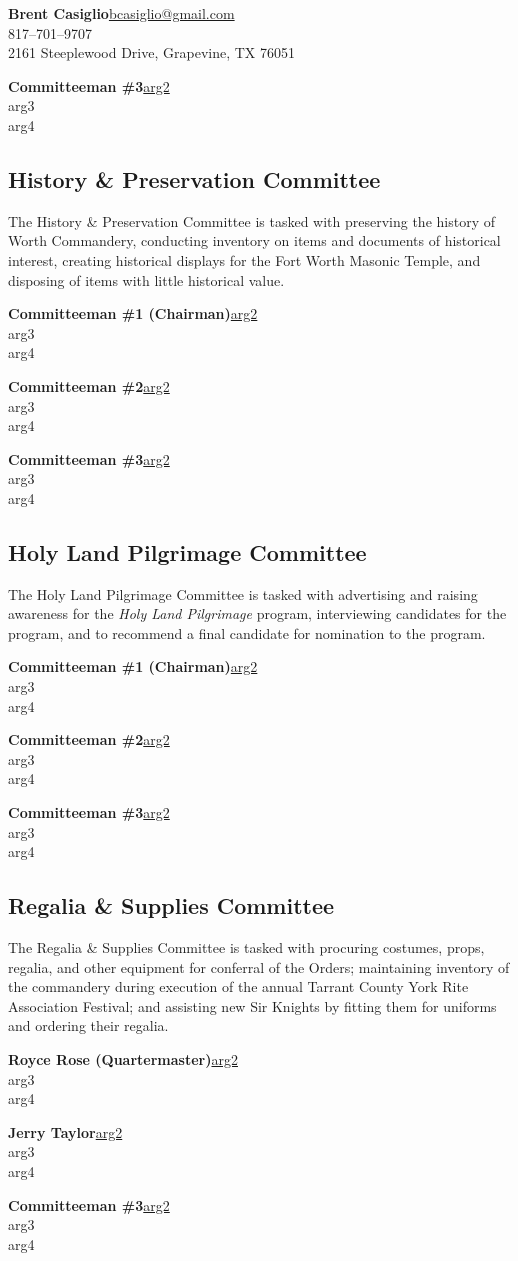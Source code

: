 \documentclass[letterpaper]{article}
\newcommand{\cman}[4]{\textbf{#1}\hfill{}\url{#2}\\\hphantom{0em}\hfill{}#3\\\hphantom{0em}\hfill{}#4}
\newcommand{\comm}[3]{\subsection*{#1 Committee\textsuperscript{#2}}The #1 Committee is tasked with #3}
\begin{document}
		\cman{Brent Casiglio}{bcasiglio@gmail.com}{817--701--9707}{2161 Steeplewood Drive, Grapevine, TX 76051}
		
		\cman{Committeeman \#3}{arg2}{arg3}{arg4}
		
		
		
		

	\comm{History \& Preservation}{}{preserving the history of Worth Commandery, conducting inventory on items and documents of historical interest, creating historical displays for the Fort Worth Masonic Temple, and disposing of items with little historical value.}
	
		\cman{Committeeman \#1 (Chairman)}{arg2}{arg3}{arg4}
		
		\cman{Committeeman \#2}{arg2}{arg3}{arg4}
		
		\cman{Committeeman \#3}{arg2}{arg3}{arg4}
	
	\comm{Holy Land Pilgrimage}{}{advertising and raising awareness for the \textit{Holy Land Pilgrimage} program, interviewing candidates for the program, and to recommend a final candidate for nomination to the program.}
	
		\cman{Committeeman \#1 (Chairman)}{arg2}{arg3}{arg4}
		
		\cman{Committeeman \#2}{arg2}{arg3}{arg4}
		
		\cman{Committeeman \#3}{arg2}{arg3}{arg4}
	
	\comm{Regalia \& Supplies}{}{procuring costumes, props, regalia, and other equipment for conferral of the Orders; maintaining inventory of the commandery during execution of the annual Tarrant County York Rite Association Festival; and assisting new Sir Knights by fitting them for uniforms and ordering their regalia.}
	
		\cman{Royce Rose (Quartermaster)}{arg2}{arg3}{arg4}
		
		\cman{Jerry Taylor}{arg2}{arg3}{arg4}
		
		\cman{Committeeman \#3}{arg2}{arg3}{arg4}
		
\end{document}
